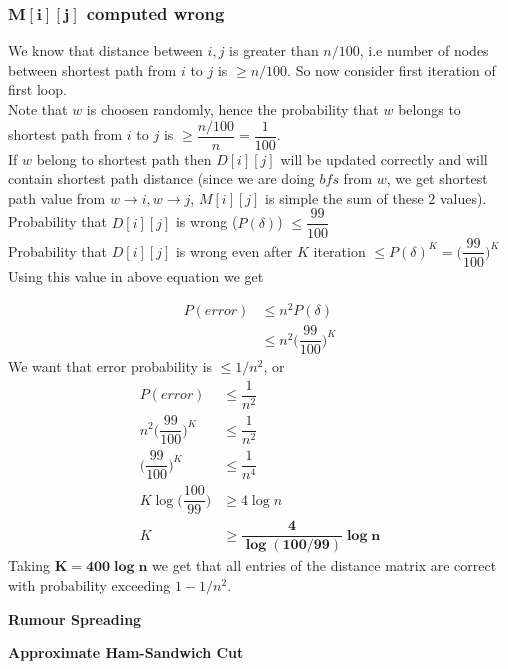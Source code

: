 \documentclass[a4paper]{article}
\newcommand{\V}[1]{\boldsymbol{#1}}
\begin{document}
\subsubsection*{$\V{M[i][j]}$ computed wrong}
We know that distance between $i, j$ is greater than $n/100$, i.e number of nodes between shortest path from $i$ to $j$ is $\geq n/100$.
So now consider first iteration of first loop. \\
Note that $w$ is choosen randomly, hence the probability that $w$ belongs to shortest path from $i$ to $j$ is $\geq \dfrac{n/100}{n} = \dfrac{1}{100}$. \\
If $w$ belong to shortest path then $D[i][j]$ will be updated correctly and will contain shortest path distance (since we are doing $bfs$ from $w$, we get shortest path value from $w\rightarrow i, w\rightarrow j$, $M[i][j]$ is simple the sum of these $2$ values).\\
Probability that $D[i][j]$ is wrong ($P(\delta)$) $\leq \dfrac{99}{100}$ \\
Probability that $D[i][j]$ is wrong even after $K$ iteration $\leq P(\delta)^{K} = \Bigg( \dfrac{99}{100} \Bigg)^K$ \\
Using this value in above equation we get

\begin{align*}
P(error) &\leq n^2 P(\delta) \\
		 &\leq n^2 \Bigg( \dfrac{99}{100} \Bigg)^K
\end{align*}
We want that error probability is $\leq 1/n^2$, or
\begin{align*}
P(error) &\leq \dfrac{1}{n^2} \\
n^2 \Bigg( \dfrac{99}{100} \Bigg)^K &\leq \dfrac{1}{n^2} \\
\Bigg( \dfrac{99}{100} \Bigg)^K &\leq \dfrac{1}{n^4}\\
K\log \Bigg( \dfrac{100}{99}\Bigg) &\geq 4\log n \\
K &\geq \V{\dfrac{4}{\log(100/99)} \log n}
\end{align*}
Taking $\V{K = 400\log n}$ we get that all entries of the distance matrix are correct with probability exceeding $1 - 1/n^2$.
\pagebreak

\begin{question}[]
\textbf{Rumour Spreading}
\end{question}


\pagebreak
\begin{question}[]
\textbf{Approximate Ham-Sandwich Cut}

\end{question}
\end{document}
